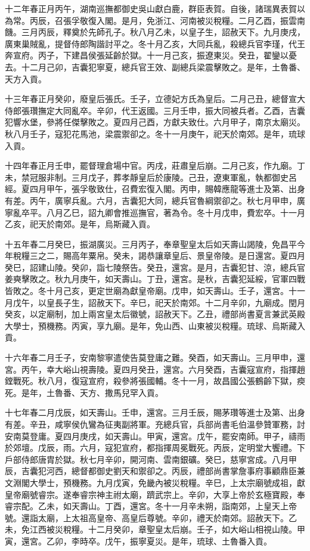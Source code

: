 \begin{pinyinscope}
十二年春正月丙午，湖南巡撫都御史吳山獻白鹿，群臣表賀。自後，諸瑞異表賀以為常。丙辰，召張孚敬復入閣。是月，免浙江、河南被災稅糧。二月乙酉，振雲南饑。三月丙辰，釋奠於先師孔子。秋八月乙未，以皇子生，詔赦天下。九月庚戌，廣東巢賊亂，提督侍郎陶諧討平之。冬十月乙亥，大同兵亂，殺總兵官李瑾，代王奔宣府。丙子，下建昌侯張延齡於獄。十一月己亥，振遼東災。癸丑，翟鑾以憂去。十二月己卯，吉囊犯寧夏，總兵官王效、副總兵梁震擊敗之。是年，土魯番、天方入貢。

十三年春正月癸卯，廢皇后張氏。壬子，立德妃方氏為皇后。二月己丑，總督宣大侍郎張瓚撫定大同亂卒。辛卯，代王返國。三月壬申，振大同被兵者。乙酉，吉囊犯響水堡，參將任傑擊敗之。夏四月己酉，方獻夫致仕。六月甲子，南京太廟災。秋八月壬子，寇犯花馬池，梁震禦卻之。冬十一月庚午，祀天於南郊。是年，琉球入貢。

十四年春正月壬申，罷督理倉場中官。丙戌，莊肅皇后崩。二月己亥，作九廟。丁未，禁冠服非制。三月戊子，葬孝靜皇后於康陵。己丑，遼東軍亂，執都御史呂經。夏四月甲午，張孚敬致仕，召費宏復入閣。丙申，賜韓應龍等進士及第、出身有差。丙午，廣寧兵亂。六月，吉囊犯大同，總兵官魯綱禦卻之。秋七月甲申，廣寧亂卒平。八月乙巳，詔九卿會推巡撫官，著為令。冬十月戊申，費宏卒。十一月乙亥，祀天於南郊。是年，烏斯藏入貢。

十五年春二月癸巳，振湖廣災。三月丙子，奉章聖皇太后如天壽山謁陵，免昌平今年稅糧三之二，賜高年粟帛。癸未，謁恭讓章皇后、景皇帝陵。是日還宮。夏四月癸巳，詔建山陵。癸卯，詣七陵祭告。癸丑，還宮。是月，吉囊犯甘、涼，總兵官姜奭擊敗之。秋九月庚午，如天壽山。丁丑，還宮。是秋，吉囊犯延綏，官軍四戰皆敗之。冬十月己亥，更定世廟為獻皇帝廟。戊申，如天壽山。壬子，還宮。十一月戊午，以皇長子生，詔赦天下。辛巳，祀天於南郊。十二月辛卯，九廟成。閏月癸亥，以定廟制，加上兩宮皇太后徽號，詔赦天下。乙丑，禮部尚書夏言兼武英殿大學士，預機務。丙寅，享九廟。是年，免山西、山東被災稅糧。琉球、烏斯藏入貢。

十六年春二月壬子，安南黎寧遣使告莫登庸之難。癸酉，如天壽山。三月甲申，還宮。丙午，幸大峪山視壽陵。夏四月癸丑，還宮。六月癸酉，吉囊寇宣府，指揮趙鏜戰死。秋八月，復寇宣府，殺參將張國輔。冬十一月，故昌國公張鶴齡下獄，瘐死。是年，土魯番、天方、撒馬兒罕入貢。

十七年春二月戊辰，如天壽山。壬申，還宮。三月壬辰，賜茅瓚等進士及第、出身有差。辛丑，咸寧侯仇鸞為征夷副將軍。充總兵官，兵部尚書毛伯溫參贊軍務，討安南莫登庸。夏四月庚戌，如天壽山。甲寅，還宮。戊午，罷安南師。甲子，禱雨於郊壇。戊辰，雨。六月，寇犯宣府，都指揮周冕戰死。丙辰，定明堂大饗禮。下戶部侍郎唐胄於獄。秋七月辛卯，開河南、雲南銀礦。癸巳，慈寧宮成。八月甲辰，吉囊犯河西，總督都御史劉天和禦卻之。丙辰，禮部尚書掌詹事府事顧鼎臣兼文淵閣大學士，預機務。九月戊寅，免畿內被災稅糧。辛巳，上太宗廟號成祖，獻皇帝廟號睿宗。遂奉睿宗神主祔太廟，躋武宗上。辛卯，大享上帝於玄極寶殿，奉睿宗配。乙未，如天壽山。丁酉，還宮。冬十一月辛未朔，詣南郊，上皇天上帝號。還詣太廟，上太祖高皇帝、高皇后尊號。辛卯，禮天於南郊。詔赦天下。乙未，免江西被災稅糧。十二月癸卯，章聖皇太后崩。壬子，如大峪山相視山陵。甲寅，還宮。乙卯，李時卒。戊午，振寧夏災。是年，琉球、土魯番入貢。


\end{pinyinscope}
